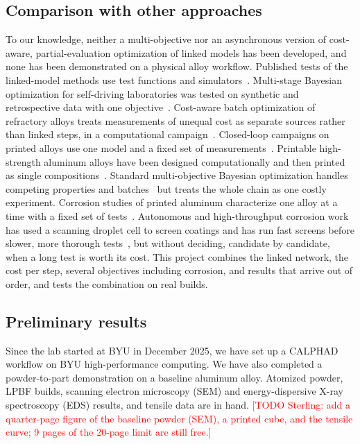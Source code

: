 \documentclass[12pt,letterpaper]{article}
\newcommand{\todo}[1]{\textcolor{red}{[TODO Sterling: #1]}}
\begin{document}
\subsection{Comparison with other approaches}

To our knowledge, neither a multi-objective nor an asynchronous version of
cost-aware, partial-evaluation optimization of linked models has been
developed, and none has been demonstrated on a physical alloy workflow.
Published tests of the linked-model methods use test functions and
simulators~\cite{astudillo2021,buathong2024}. Multi-stage Bayesian
optimization for self-driving laboratories was tested on synthetic and
retrospective data with one objective~\cite{torresi2026}. Cost-aware batch
optimization of refractory alloys treats measurements of unequal cost as
separate sources rather than linked steps, in a computational
campaign~\cite{alvi2026}. Closed-loop campaigns on printed alloys use one
model and a fixed set of measurements~\cite{talbot2026}. Printable
high-strength aluminum alloys have been designed computationally and then
printed as single compositions~\cite{thapliyal2020,taheri2025}. Standard multi-objective Bayesian
optimization handles competing properties and batches~\cite{daulton2021} but
treats the whole chain as one costly experiment. Corrosion studies of printed
aluminum characterize one alloy at a time with a fixed set of
tests~\cite{cabrini2016,linder2024,zhou2021}. Autonomous and high-throughput
corrosion work has used a scanning droplet cell to screen coatings and has
run fast screens before slower, more thorough tests~\cite{decost2022,sur2023},
but without deciding, candidate by candidate, when a long test is worth its
cost. This project combines the
linked network, the cost per step, several objectives including corrosion,
and results that arrive out of order, and tests the combination on real
builds.

\subsection{Preliminary results}
\label{sec:prelim}

Since the lab started at BYU in December 2025, we have set up a CALPHAD
workflow on BYU high-performance computing. We have also completed a
powder-to-part demonstration on a baseline aluminum alloy. Atomized powder,
LPBF builds, scanning electron microscopy (SEM) and energy-dispersive X-ray
spectroscopy (EDS) results, and tensile data are in hand.
\todo{add a quarter-page figure of the baseline powder (SEM), a printed cube,
and the tensile curve; 9 pages of the 20-page limit are still free.}
\end{document}
